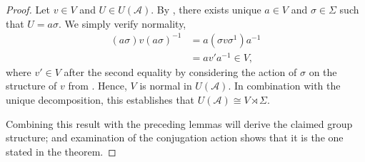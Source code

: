 \documentclass[11pt, twocolumn, floatfix, superscriptaddress, aps, prb, raggedbottom]{revtex4-2}
\begin{document}




\begin{proof}
Let $v \in V$ and $U \in U(\mathcal{A})$.
By , there exists unique $a \in V$ and $\sigma \in \Sigma$ such that $U = a \sigma$.
We simply verify normality,
\begin{align}
  (a\sigma) v (a\sigma)^{-1} &= a (\sigma v \sigma^{1}) a^{-1} \\
  &= a v' a^{-1} \in V\text{,}
\end{align}
where $v' \in V$ after the second equality by considering the action of $\sigma$ on the structure of $v$ from .
Hence, $V$ is normal in $U(\mathcal{A})$.
In combination with the unique decomposition, this establishes that $U(\mathcal{A}) \cong V \rtimes \Sigma$.

Combining this result with the preceding lemmas will derive the claimed group structure; and examination of the conjugation action shows that it is the one stated in the theorem.
\end{proof}
\end{document}
